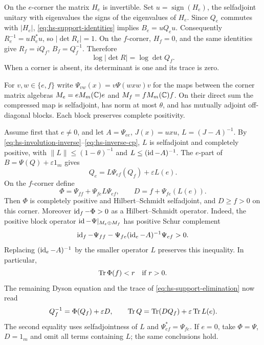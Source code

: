 On the $e$-corner the matrix $H_e$ is invertible.
Set $u=\operatorname{sign}(H_e)$, the selfadjoint unitary with eigenvalues the signs of the eigenvalues of $H_e$.
Since $Q_e$ commutes with $|H_e|$, \eqref{eq:hs-support-identities} implies $B_e=uQ_eu$.
Consequently $R_e^{-1}=uR_e^*u$, so $|\det R_e|=1$.
On the $f$-corner, $H_f=0$, and the same identities give $R_f=iQ_f$, $B_f=Q_f^{-1}$.
Therefore
\begin{equation}\label{eq:hs-kernel-determinant}
 \log|\det R|=\log\det Q_f.
\end{equation}
When a corner is absent, its determinant is one and its trace is zero.

For $v,w\in\{e,f\}$ write $\Psi_{vw}(x)=v\Psi(wxw)v$ for the maps between the corner matrix algebras $M_e=eM_m(\mathbb C)e$ and $M_f=fM_m(\mathbb C)f$.
On their direct sum the compressed map is selfadjoint, has norm at most $\theta$, and has mutually adjoint off-diagonal blocks.
Each block preserves complete positivity.

Assume first that $e\ne0$, and let $A=\Psi_{ee}$, $J(x)=uxu$, $L=(J-A)^{-1}$.
By \eqref{eq:hs-involution-inverse}--\eqref{eq:hs-inverse-cp}, $L$ is selfadjoint and completely positive, with $\|L\|\le(1-\theta)^{-1}$ and $L\le(\operatorname{id}-A)^{-1}$.
The $e$-part of $B=\Psi(Q)+\varepsilon1_m$ gives
\begin{equation}\label{eq:hs-support-elimination}
 Q_e=L\Psi_{ef}(Q_f)+\varepsilon L(e).
\end{equation}
On the $f$-corner define
\begin{equation}\label{eq:hs-effective-data}
 \Phi=\Psi_{ff}+\Psi_{fe}L\Psi_{ef},\qquad
 D=f+\Psi_{fe}(L(e)).
\end{equation}
Then $\Phi$ is completely positive and Hilbert--Schmidt selfadjoint, and $D\ge f>0$ on this corner.
Moreover $\operatorname{id}_f-\Phi>0$ as a Hilbert--Schmidt operator.
Indeed, the positive block operator $\operatorname{id}-\Psi|_{M_e\oplus M_f}$ has positive Schur complement
\[
 \operatorname{id}_f-\Psi_{ff}-\Psi_{fe}(\operatorname{id}_e-A)^{-1}\Psi_{ef}>0.
\]
Replacing $(\operatorname{id}_e-A)^{-1}$ by the smaller operator $L$ preserves this inequality.
In particular,
\begin{equation}\label{eq:hs-effective-trace}
 \operatorname{Tr}\Phi(f)<r\quad\text{if }r>0.
\end{equation}
The remaining Dyson equation and the trace of \eqref{eq:hs-support-elimination} now read
\begin{equation}\label{eq:hs-effective-equation}
 Q_f^{-1}=\Phi(Q_f)+\varepsilon D,\qquad
 \operatorname{Tr} Q=\operatorname{Tr}(DQ_f)+\varepsilon\operatorname{Tr} L(e).
\end{equation}
The second equality uses selfadjointness of $L$ and $\Psi_{ef}^*=\Psi_{fe}$.
If $e=0$, take $\Phi=\Psi$, $D=1_m$ and omit all terms containing $L$; the same conclusions hold.

